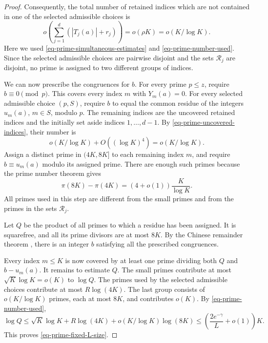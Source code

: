 \documentclass[11pt,reqno]{amsart}
\numberwithin{equation}{section}
\begin{document}
\begin{proof}
Consequently, the total number of retained indices which are not contained in one of the selected admissible choices is
\begin{equation}\label{eq-prime-uncovered-indices}
 o\left(\sum_{j=1}^d(|T_j(a)|+r_j)\right)
 =o(\rho K)=o(K/\log K).
\end{equation}
Here we used \eqref{eq-prime-simultaneous-estimates} and \eqref{eq-prime-number-used}. Since the selected admissible choices are pairwise disjoint and the sets $\mathcal R_j$ are disjoint, no prime is assigned to two different groups of indices.

We can now prescribe the congruences for $b$. For every prime $p\le z$, require $b\equiv0\pmod p$. This covers every index $m$ with $Y_m(a)=0$. For every selected admissible choice $(p,S)$, require $b$ to equal the common residue of the integers $u_m(a)$, $m\in S$, modulo $p$. The remaining indices are the uncovered retained indices and the initially set aside indices $1,\ldots,d-1$. By \eqref{eq-prime-uncovered-indices}, their number is
\[
 o(K/\log K)+O((\log K)^4)=o(K/\log K).
\]
Assign a distinct prime in $(4K,8K]$ to each remaining index $m$, and require $b\equiv u_m(a)$ modulo its assigned prime. There are enough such primes because the prime number theorem gives
\[
 \pi(8K)-\pi(4K)=(4+o(1))\frac K{\log K}.
\]
All primes used in this step are different from the small primes and from the primes in the sets $\mathcal R_j$.

Let $Q$ be the product of all primes to which a residue has been assigned. It is squarefree, and all its prime divisors are at most $8K$. By the Chinese remainder theorem \cite[Ch.~6]{Apostol}, there is an integer $b$ satisfying all the prescribed congruences.

Every index $m\le K$ is now covered by at least one prime dividing both $Q$ and $b-u_m(a)$. It remains to estimate $Q$. The small primes contribute at most $\sqrt K\log K=o(K)$ to $\log Q$. The primes used by the selected admissible choices contribute at most $R\log(4K)$. The last group consists of $o(K/\log K)$ primes, each at most $8K$, and contributes $o(K)$. By \eqref{eq-prime-number-used},
\[
 \log Q
 \le \sqrt K\log K+R\log(4K)
                +o(K/\log K)\log(8K)
 \le\left(\frac{2e^{-\gamma}}L+o(1)\right)K.
\]
This proves \eqref{eq-prime-fixed-L-size}.
\end{proof}
\end{document}
